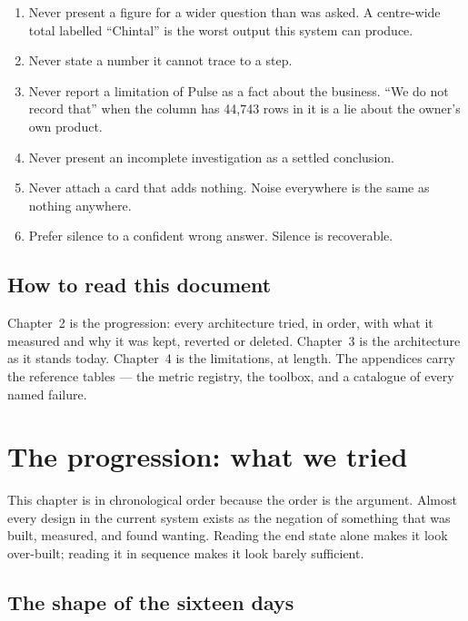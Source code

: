 \documentclass[11pt,a4paper]{report}
\begin{document}
\begin{enumerate}[leftmargin=*, itemsep=2pt]
\item Never present a figure for a wider question than was asked. A centre-wide total labelled
      ``Chintal'' is the worst output this system can produce.
\item Never state a number it cannot trace to a step.
\item Never report a limitation of Pulse as a fact about the business. ``We do not record that''
      when the column has 44{,}743 rows in it is a lie about the owner's own product.
\item Never present an incomplete investigation as a settled conclusion.
\item Never attach a card that adds nothing. Noise everywhere is the same as nothing anywhere.
\item Prefer silence to a confident wrong answer. Silence is recoverable.
\end{enumerate}

\section{How to read this document}

Chapter~2 is the progression: every architecture tried, in order, with what it measured and why it
was kept, reverted or deleted. Chapter~3 is the architecture as it stands today. Chapter~4 is the
limitations, at length. The appendices carry the reference tables --- the metric registry, the
toolbox, and a catalogue of every named failure.

\chapter{The progression: what we tried}

This chapter is in chronological order because the order is the argument. Almost every design in
the current system exists as the negation of something that was built, measured, and found
wanting. Reading the end state alone makes it look over-built; reading it in sequence makes it
look barely sufficient.

\section{The shape of the sixteen days}
\end{document}
